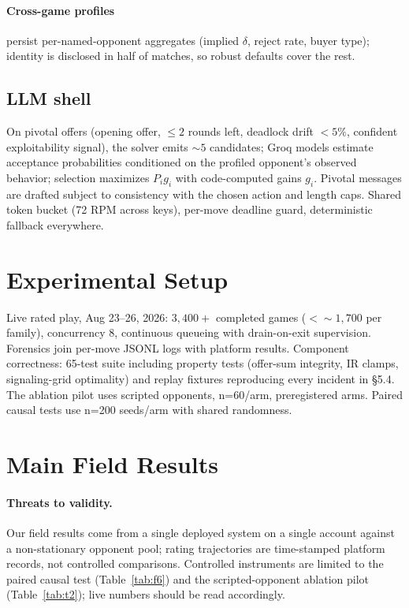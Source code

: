 \documentclass[11pt]{article}
\begin{document}
\paragraph{Cross-game profiles} persist per-named-opponent aggregates (implied $\delta$, reject rate, buyer type); identity is disclosed in half of matches, so robust defaults cover the rest.

\subsection{LLM shell}
On pivotal offers (opening offer, $\le 2$ rounds left, deadlock drift $<5\%$, confident exploitability signal), the solver emits ${\sim}5$ candidates; Groq models estimate acceptance probabilities conditioned on the profiled opponent's observed behavior; selection maximizes $P_i g_i$ with code-computed gains $g_i$. Pivotal messages are drafted subject to consistency with the chosen action and length caps. Shared token bucket (72 RPM across keys), per-move deadline guard, deterministic fallback everywhere.

\section{Experimental Setup}
Live rated play, Aug 23--26, 2026: $3{,}400{+}$ completed games (${<}{\sim}1{,}700$ per family), concurrency 8, continuous queueing with drain-on-exit supervision. Forensics join per-move JSONL logs with platform results. Component correctness: 65-test suite including property tests (offer-sum integrity, IR clamps, signaling-grid optimality) and replay fixtures reproducing every incident in \S5.4. The ablation pilot uses scripted opponents, n=60/arm, preregistered arms. Paired causal tests use n=200 seeds/arm with shared randomness.

\section{Main Field Results}

\paragraph{Threats to validity.} Our field results come from a single
deployed system on a single account against a non-stationary opponent pool;
rating trajectories are time-stamped platform records, not controlled
comparisons. Controlled instruments are limited to the paired causal test
(Table~\ref{tab:f6}) and the scripted-opponent ablation pilot
(Table~\ref{tab:t2}); live numbers should be read accordingly.
\end{document}
